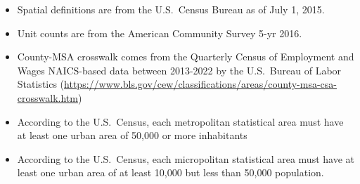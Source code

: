 \begin{itemize}
\item Spatial definitions are from the U.S.~Census Bureau as of July 1, 2015.
\item Unit counts are from the American Community Survey 5-yr 2016.
\item County-MSA crosswalk comes from the Quarterly Census of Employment and Wages NAICS-based data between 2013-2022 by the U.S.~Bureau of Labor Statistics (\href{https://www.bls.gov/cew/classifications/areas/county-msa-csa-crosswalk.htm}{https://www.bls.gov/cew/classifications/areas/county-msa-csa-crosswalk.htm})
\item According to the U.S.~Census, each metropolitan statistical area must have at least one urban area of 50,000 or more inhabitants
\item According to the U.S.~Census, each micropolitan statistical area must have at least one urban area of at least 10,000 but less than 50,000 population.
\end{itemize}
